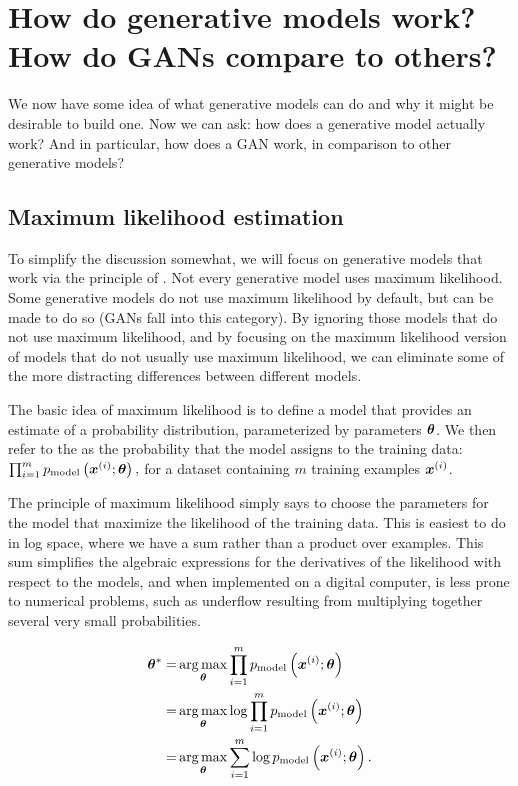 \section{How do generative models work? How do GANs compare to others?}
\label{sec:tree}

We now have some idea of what generative models can do and why it might be
desirable to build one.
Now we can ask: how does a generative model actually work? And in particular,
how does a GAN work, in comparison to other generative models?

\subsection{Maximum likelihood estimation}

To simplify the discussion somewhat, we will focus on generative models
that work via the principle of .
Not every generative model uses maximum likelihood.
Some generative models do not use maximum likelihood by default, but
can be made to do so (GANs fall into this category).
By ignoring those models that do not use maximum likelihood, and
by focusing on the maximum likelihood version of models that do not
usually use maximum likelihood, we can eliminate some of the more 
distracting differences between different models.

The basic idea of maximum likelihood is to define a model that provides
an estimate of a probability distribution, parameterized by parameters
${\bm{\theta}}$.
We then refer to the  as the probability that the model
assigns to the training data: $\prod_{i=1}^m p_{\rm{model}}\left({\bm{x}}^{(i)}; {\bm{\theta}} \right),$
for a dataset containing $m$ training examples ${\bm{x}}^{(i)}$.

The principle of maximum likelihood simply says to choose the parameters for the model
that maximize the likelihood of the training data.
This is easiest to do in log space, where we have a sum rather than a product
over examples.
This sum simplifies the algebraic expressions for the derivatives of the likelihood
with respect to the models, and when implemented on a digital computer, is less
prone to numerical problems, such as underflow resulting from multiplying together
several very small probabilities.

\begin{align}
{\bm{\theta}}^* =& \operatorname*{arg\,max}_{\bm{\theta}} \prod_{i=1}^m p_{\rm{model}}\left({\bm{x}}^{(i)}; {\bm{\theta}} \right) \\
  =& \operatorname*{arg\,max}_{\bm{\theta}} \log \prod_{i=1}^m p_{\rm{model}}\left({\bm{x}}^{(i)}; {\bm{\theta}} \right) \label{eq:log} \\
          =& \operatorname*{arg\,max}_{\bm{\theta}} \sum_{i=1}^m \log p_{\rm{model}}\left({\bm{x}}^{(i)}; {\bm{\theta}} \right).
\end{align}

